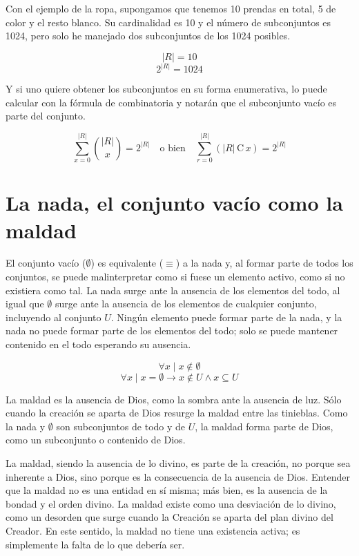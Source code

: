 \documentclass[letterpaper,13pt]{article}
\begin{document}
Con el ejemplo de la ropa, supongamos que tenemos 10 prendas en total, 5 de color y el resto blanco. Su cardinalidad es 10 y el número de subconjuntos es 1024, pero solo he manejado dos subconjuntos de los 1024 posibles.

\[
|R| = 10
\]
\[
2^{|R|} = 1024
\]

Y si uno quiere obtener los subconjuntos en su forma enumerativa, lo puede calcular con la fórmula de combinatoria y notarán que el subconjunto vacío es parte del conjunto.

\[
\sum_{x=0}^{|R|} \binom{|R|}{x} = 2^{|R|} \quad \text{o bien} \quad \sum_{r=0}^{|R|} \left( {\scriptscriptstyle |R|} \, \text{C} \, x \right) = 2^{|R|}
\]

\section{La nada, el conjunto vacío como la maldad}

El conjunto vacío (\( \emptyset \)) es equivalente (\( \equiv \)) a la nada y, al formar parte de todos los conjuntos, se puede malinterpretar como si fuese un elemento activo, como si no existiera como tal. La nada surge ante la ausencia de los elementos del todo, al igual que \( \emptyset \) surge ante la ausencia de los elementos de cualquier conjunto, incluyendo al conjunto \( U \). Ningún elemento puede formar parte de la nada, y la nada no puede formar parte de los elementos del todo; solo se puede mantener contenido en el todo esperando su ausencia.

\[
\forall x \mid x \notin \emptyset
\]
\[
\forall x \mid x = \emptyset \rightarrow x \notin U \land x \subseteq U
\]

La maldad es la ausencia de Dios, como la sombra ante la ausencia de luz. Sólo cuando la creación se aparta de Dios resurge la maldad entre las tinieblas. Como la nada y \( \emptyset \) son subconjuntos de todo y de \( U \), la maldad forma parte de Dios, como un subconjunto o contenido de Dios.

La maldad, siendo la ausencia de lo divino, es parte de la creación, no porque sea inherente a Dios, sino porque es la consecuencia de la ausencia de Dios. Entender que la maldad no es una entidad en sí misma; más bien, es la ausencia de la bondad y el orden divino. La maldad existe como una desviación de lo divino, como un desorden que surge cuando la Creación se aparta del plan divino del Creador. En este sentido, la maldad no tiene una existencia activa; es simplemente la falta de lo que debería ser.
\end{document}
